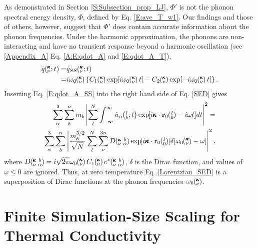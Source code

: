 \documentclass[12pt,twocolumn,iop]{/usr/share/texmf-texlive/tex/latex/iop/iopart}[/usr/share/texmf-texlive/tex/latex/iop/]
\newcommand{\EXP}[1]{\exp\mspace{-5.0mu}\left[#1\right]\mspace{-3.0mu}}
\newcommand{\ab}[2]{\mspace{-4.0mu}\left(\mspace{-8.0mu}\begin{smallmatrix}&\ifthenelse{\equal{#1}{}}{a}{#1} \\&\ifthenelse{\equal{#2}{}}{b}{#2}\end{smallmatrix}\mspace{-3.0mu}\right)}
\newcommand{\kvba}{\mspace{-4.0mu}\left(\mspace{-8.0mu}\begin{smallmatrix} &\pmb{\kappa} &b \\ &\nu &\alpha\end{smallmatrix}\mspace{-3.0mu}\right)}
\newcommand{\kvt}{\mspace{-4.0mu}\left(\mspace{-8.0mu}\begin{smallmatrix}&\pmb{\kappa} \\&\nu\end{smallmatrix}\mspace{-2.0mu};t\right)}
\newcommand{\kv}{\mspace{-4.0mu}\left(\mspace{-8.0mu}\begin{smallmatrix}&\pmb{\kappa} \\&\nu\end{smallmatrix}\mspace{-3.0mu}\right)}
\newcommand{\lbt}{\mspace{-4.0mu}\left(\mspace{-8.0mu}\begin{smallmatrix}&l \\&b\end{smallmatrix}\mspace{-2.0mu};t\right)}
\begin{document}
As demonstrated in Section \ref{S:Subsection_prop_LJ}, $\Phi'$ is not the phonon spectral energy density, $\Phi$, defined by Eq$.$ \eqref{E:ave_T_w1}. Our findings and those of others,\cite{maruyama2003,dekoker2009,thomas2010c,qiu2011,shiomi2011a} however, suggest that $\Phi'$ does contain accurate information about the phonon frequencies.  Under the harmonic approximation, the phonons are non-interacting and have no transient response beyond a harmonic oscillation (see \ref{Appendix_A} Eq$.$ \eqref{A:E:qdot_A} and \eqref{E:qdot_A_T}),
\begin{equation}\label{E:qdot_A_SS}
\begin{split}
\dot{q}\kvt =& \dot{q}_{SS}\kvt  \\
=& i\omega_0\kv\left\{C_1\kv\exp[i\omega_0\kv t]-C_2\kv\exp[-i\omega_0\kv t]\right\}.
 \end{split}
\end{equation}
Inserting Eq$.$ \eqref{E:qdot_A_SS} into the right hand side of Eq$.$ \eqref{SED} gives
\begin{equation}\label{Delta_SED}
\begin{split}
\sum_\alpha^3 \sum_b^n m_b \left| \sum_l^N  \int_{-\infty}^{\infty} \dot{u}_{\alpha}\lbt \EXP{i\pmb{\kappa}\cdot\mathbf{r}_0\ab{l}{0}-i\omega t} dt \right|^2 =& \\
\sum_\alpha^3 \sum_b^n\left| \frac{m_b^{3/2}}{\sqrt{N}} \sum_l^N \sum_{\nu}^{3n}  D\kvba \EXP{i\pmb{\kappa}\cdot\mathbf{r}_0\ab{l}{0}} \delta[ \omega_0\kv - \omega] \right|^2 ,
 \end{split}
\end{equation}
where $D\kvba = i\sqrt{2\pi} \omega_0\kv C_1\kv e^*\kvba$, $\delta$ is the Dirac function, and values of $\omega \le 0$ are ignored. Thus, at zero temperature Eq$.$ \eqref{Lorentzian_SED} is a superposition of Dirac functions at the phonon frequencies $\omega_0\kv$.

\section{\label{Appendix_C}Finite Simulation-Size Scaling for Thermal Conductivity}
\end{document}

